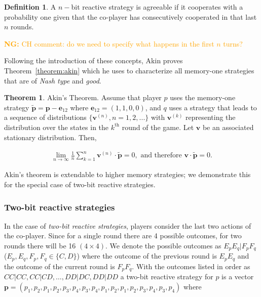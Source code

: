 \documentclass{article}
\theoremstyle{definition}
\newtheorem{definition}{Definition}[section]
\newtheorem{theorem}{Theorem}[section]
\newcommand{\nikoleta}[1]{\textcolor{orange}{{\bf NG:} #1}}
\begin{document}
\begin{definition}\label{def:agreeable}
A \(n-\)bit reactive strategy is agreeable if it cooperates with a probability one
given that the co-player has consecutively cooperated in that last \(n\) rounds.
\end{definition}

\nikoleta{CH comment: do we need to specify what happens in the first \(n\) turns?}

Following the introduction of these concepts, Akin proves
Theorem~\ref{theorem:akin} which he uses to characterize all memory-one
strategies that are of \textit{Nash type} and \textit{good}.

\begin{theorem}{Akin's Theorem.}
  Assume that player \(p\) uses the memory-one strategy \(\mathbf{\tilde{p}} = \mathbf{p} - \mathbf{e}_{12}\) where
  \(\mathbf{e}_{12} = (1, 1, 0, 0)\), and \(q\) uses a strategy that leads to a sequence
  of distributions \(\{\mathbf{v}^{(n)}, n = 1, 2, ...\}\) with \(\mathbf{v}^{(k)}\) representing the
  distribution over the states in the \(k^{\text{th}}\) round of the game. Let
  \(\mathbf{v}\) be an associated stationary distribution. Then,

  \begin{align}
    \lim_{n \rightarrow \infty} \frac{1}{n} \sum_{k=1}^{n} \mathbf{v}^{(n)} \cdot \mathbf{\tilde{p}} = 0, \text{ and therefore } \mathbf{v} \cdot \mathbf{\tilde{p}} = 0.
  \end{align}
\end{theorem}\label{theorem:akin}

Akin's theorem is extendable to higher memory strategies; we demonstrate this for
the special case of two-bit reactive strategies.

\subsubsection{Two-bit reactive strategies}

In the case of \textit{two-bit reactive strategies}, players consider the last
two actions of the co-player.  Since for a single round there are 4 possible
outcomes, for two rounds there will be 16 \((4 \times 4)\). We denote the
possible outcomes as \(E_p E_q | F_p F_q\) (\(E_p, E_q, F_p, F_q \in \{C, D\}\))
where the outcome of the previous round is \(E_p E_q\) and the outcome of the
current round is \(F_p F_q\). With the outcomes listed in order as \(CC|CC,
CC|CD, \dots, DD|DC, DD|DD\) a two-bit reactive strategy for \(p\) is a vector
\(\mathbf{p} = (p_1, p_2, p_1, p_2, p_3, p_4, p_3, p_4, p_1, p_2, p_1, p_2, p_3,
p_4, \allowbreak p_3, p_4)\) where
\end{document}
